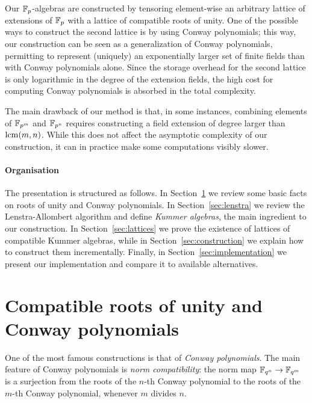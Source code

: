 \documentclass{sig-alternate}
\begin{document}
Our $\mathbb{F}_p$-algebras are constructed by tensoring element-wise an
arbitrary lattice of extensions of $\mathbb{F}_p$ with a lattice of compatible
roots of unity. %
One of the possible ways to construct the second lattice is by using
Conway polynomials; this way, our construction can be seen as a
generalization of Conway polynomials, permitting to represent
(uniquely) an exponentially larger set of finite fields than with
Conway polynomials alone. %
Since the storage overhead for the second lattice is only logarithmic
in the degree of the extension fields, the high cost for computing
Conway polynomials is absorbed in the total complexity.

The main drawback of our method is that, in some instances, combining
elements of $\mathbb{F}_{p^m}$ and $\mathbb{F}_{p^n}$ requires constructing a field
extension of degree larger than $\operatorname{lcm}(m,n)$. %
While this does not affect the asymptotic complexity of our
construction, %
it can in practice make some computations visibly slower.


\paragraph{Organisation}
The presentation is structured as follows. %
In Section~\ref{sec:conway} we review some basic facts on roots of
unity and Conway polynomials. %
In Section~\ref{sec:lenstra} we review the Lenstra-Allombert algorithm
and define \emph{Kummer
  algebras}, %
the main ingredient to our construction. %
In Section~\ref{sec:lattices} we prove the existence of lattices of
compatible Kummer algebras, while in Section~\ref{sec:construction} we
explain how to construct them incrementally. %
Finally, in Section~\ref{sec:implementation} we present our
implementation and compare it to available alternatives.


\section{Compatible roots of unity and Conway polynomials}
\label{sec:conway}


One of the most famous constructions is that of \emph{Conway
  polynomials}. %
The main feature of Conway polynomials is \emph{norm compatibility}:
the norm map $\mathbb{F}_{q^n}\to\mathbb{F}_{q^m}$ is a surjection from the roots of the
$n$-th Conway polynomial to the roots of the $m$-th Conway polynomial,
whenever $m$ divides $n$. %
\end{document}
